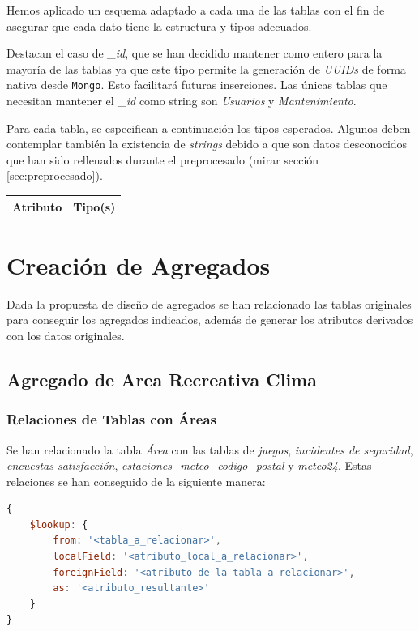 \documentclass[]{article}
\begin{document}
Hemos aplicado un esquema adaptado a cada una de las tablas con el fin de asegurar que cada dato tiene la estructura y tipos adecuados.

Destacan el caso de \textit{\_id}, que se han decidido mantener como entero para la mayoría de las tablas ya que este tipo permite la generación de \textit{UUIDs} de forma nativa desde \texttt{Mongo}. Esto facilitará futuras inserciones. Las únicas tablas que necesitan mantener el \textit{\_id} como string son \textit{Usuarios} y \textit{Mantenimiento}. 

Para cada tabla, se especifican a continuación los tipos esperados. Algunos deben contemplar también la existencia de \textit{strings} debido a que son datos desconocidos que han sido rellenados durante el preprocesado (mirar sección \ref{sec:preprocesado}).

\begin{center}
\begin{tabular}{|c|c|}
    \hline
    Atributo & Tipo(s)\\
    \hline
    

\end{tabular}
\end{center}

\newpage
\section{Creación de Agregados}
\label{sec:creacion_agregados}
Dada la propuesta de diseño de agregados se han relacionado las tablas originales para conseguir los agregados indicados, además de generar los atributos derivados con los datos originales.

\subsection{Agregado de Area Recreativa Clima}
\label{subsec:agregado_area}

\subsubsection{Relaciones de Tablas con Áreas}
\label{subsubsec:relaciones_area}

Se han relacionado la tabla \textit{Área} con las tablas de \textit{juegos}, \textit{incidentes de seguridad}, \textit{encuestas satisfacción}, \textit{estaciones\_meteo\_codigo\_postal} y \textit{meteo24}.
Estas relaciones se han conseguido de la siguiente manera:
\begin{lstlisting}[language=JavaScript, caption=Operadores para relacionar tablas en mongodb]
{
    $lookup: {
        from: '<tabla_a_relacionar>',
        localField: '<atributo_local_a_relacionar>',
        foreignField: '<atributo_de_la_tabla_a_relacionar>',
        as: '<atributo_resultante>'
    }
}
\end{lstlisting}
\end{document}
